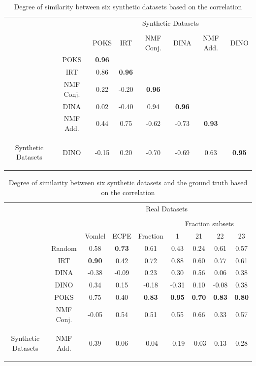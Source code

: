 \begin{table}[h]
\center
\begin{tabular}{c|c|c|c|c|c|c|c|}
\multicolumn{2}{c}{} & \multicolumn{6}{c}{Synthetic Datasets} \tabularnewline
\multicolumn{8}{c}{} \tabularnewline
\cline{3-8} 
\multicolumn{2}{c|}{} & POKS & IRT & NMF Conj. & DINA & NMF Add. & DINO\tabularnewline
\cline{2-8}
\cline{2-3}
&POKS & \textbf {0.96} & \multicolumn{1}{|c}{} & \multicolumn{1}{c}{} & \multicolumn{1}{c}{} & \multicolumn{1}{c}{}\tabularnewline
\cline{2-4}
&IRT & 0.86 & \textbf {0.96} & \multicolumn{1}{|c}{} & \multicolumn{1}{c}{} & \multicolumn{1}{c}{} & \multicolumn{1}{c}{}\tabularnewline
\cline{2-5}
&NMF Conj. & 0.22 & -0.20 & \textbf {0.96} & \multicolumn{1}{|c}{} & \multicolumn{1}{c}{} & \multicolumn{1}{c}{}\tabularnewline
\cline{2-6}
&DINA & 0.02 & -0.40 & 0.94 & \textbf {0.96} & \multicolumn{1}{|c}{} & \multicolumn{1}{c}{}\tabularnewline
\cline{2-7}
&NMF Add. & 0.44 & 0.75 & -0.62 & -0.73 & \textbf {0.93} & \multicolumn{1}{|c}{}\tabularnewline
\cline{2-8}
\multicolumn{1}{c|}{\multirow{-6}{*}{\begin{sideways}Synthetic Datasets\end{sideways}}}&DINO & -0.15 & 0.20 & -0.70 & -0.69 & 0.63 & \textbf {0.95}\tabularnewline
\cline{2-8}
\end{tabular}
\caption{Degree of similarity between six synthetic datasets based on the correlation}
\label{tablSyn}
\end{table}



\begin{table}[h]
 \center
\begin{tabular}{c|c|c|c|c|c|c|c|c|}

\multicolumn{2}{c}{}&\multicolumn{7}{c}{Real Datasets}\tabularnewline   
\multicolumn{9}{c}{}\tabularnewline   
\cline{6-9}
\multicolumn{5}{c|}{}&\multicolumn{4}{c|}{Fraction subsets}   \tabularnewline   
\cline{3-9} 
\multicolumn{2}{c|}{}   & Vomlel &ECPE &Fraction &1&21&22&23\tabularnewline
\cline{2-9}
\cline{2-9}
&Random & 0.58 &\textbf {0.73} & 0.61   & 0.43 & 0.24 & 0.61 & 0.57 \tabularnewline
\cline{2-9}
&IRT & \textbf {0.90} & 0.42 & 0.72   & 0.88 & 0.60 & 0.77 & 0.61 \tabularnewline
\cline{2-9}
&DINA & -0.38  & -0.09 &   0.23 &   0.30 & 0.56 & 0.06 & 0.38 \tabularnewline
\cline{2-9}
&DINO & 0.34 & 0.15  &  -0.18 &  -0.31 & 0.10 & -0.08 & 0.38 \tabularnewline
\cline{2-9}
&POKS & 0.75 &0.40  &  \textbf {0.83}  &  \textbf {0.95} &\textbf {0.70} & \textbf {0.83} & \textbf {0.80}\tabularnewline
\cline{2-9}
 &NMF Conj. & -0.05 & 0.54  & 0.51   & 0.55  & 0.66 & 0.33 & 0.57\tabularnewline
\cline{2-9}
\multicolumn{1}{c|}{\multirow{-7}{*}{\begin{sideways}Synthetic Datasets\end{sideways}}}&NMF Add. & 0.39 &0.06   & -0.04   & -0.19 & -0.03 & 0.13 & 0.28\tabularnewline
\cline{2-9}
\end{tabular}
\caption{Degree of similarity between six synthetic datasets and the ground truth based on the correlation}
\label{tablSynReal}
\end{table}


